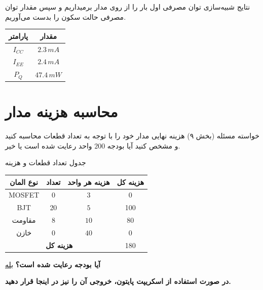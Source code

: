 \documentclass[12pt,a4paper]{article}
\begin{document}
\begin{answerbox}{نتایج شبیه‌سازی توان مصرفی}
اول بار را از روی مدار برمیداریم و سپس مقدار توان مصرفی حالت سکون را بدست می‌آوریم.

\begin{center}
\begin{tabular}{|c|c|}
\hline
\textbf{پارامتر} & \textbf{مقدار} \\
\hline
$I_{CC}$ & $2.3\, mA$\\
\hline
$I_{EE}$ &$2.4 \, mA$ \\
\hline
$P_Q$ & $47.4\, mW$\\
\hline
\end{tabular}
\end{center}

\vspace{2cm}

\end{answerbox}

\newpage

\section{محاسبه هزینه مدار}

\begin{taskbox}{خواسته مسئله (بخش ۹)}
هزینه نهایی مدار خود را با توجه به تعداد قطعات محاسبه کنید و مشخص کنید آیا بودجه $200$ واحد رعایت شده است یا خیر.
\end{taskbox}

\begin{answerbox}{جدول تعداد قطعات و هزینه}
\begin{center}
\begin{tabular}{|c|c|c|c|}
\hline
\textbf{نوع المان} & \textbf{تعداد} & \textbf{هزینه هر واحد} & \textbf{هزینه کل} \\
\hline
MOSFET &0& $3$ &0\\
\hline
BJT & 20& $5$ &100 \\
\hline
مقاومت &8 & $10$ & 80\\
\hline
خازن & 0& $40$ & 0\\
\hline
\multicolumn{3}{|c|}{\textbf{هزینه کل}} & 180\\
\hline
\end{tabular}
\end{center}

\vspace{1cm}

\textbf{آیا بودجه رعایت شده است؟} \underline{بله}

\vspace{1cm}

\textbf{در صورت استفاده از اسکریپت پایتون، خروجی آن را نیز در اینجا قرار دهید.}

\vspace{5cm}
\end{answerbox}
\end{document}
